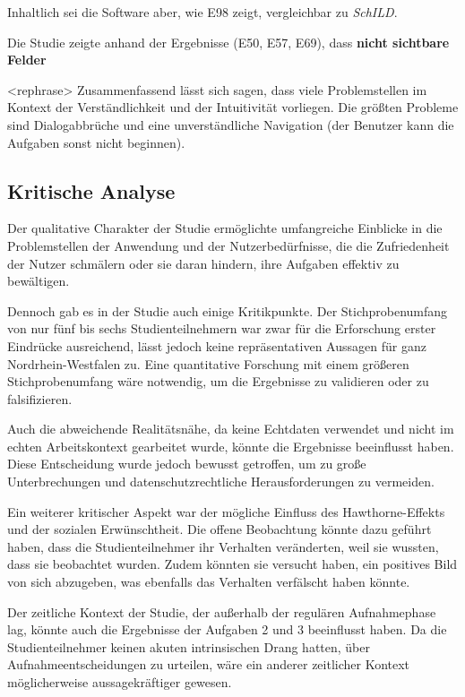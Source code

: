 Inhaltlich sei die Software aber, wie E98 zeigt, vergleichbar zu \textit{SchILD}.

Die Studie zeigte anhand der Ergebnisse (E50, E57, E69), dass \textbf{nicht sichtbare Felder}


<rephrase> Zusammenfassend lässt sich sagen, dass viele Problemstellen im Kontext der Verständlichkeit und der Intuitivität vorliegen. Die größten Probleme sind Dialogabbrüche und eine unverständliche Navigation (der Benutzer kann die Aufgaben sonst nicht beginnen).

\subsection{Kritische Analyse}
Der qualitative Charakter der Studie ermöglichte umfangreiche Einblicke in die Problemstellen der Anwendung und der Nutzerbedürfnisse, die die Zufriedenheit der Nutzer schmälern oder sie daran hindern, ihre Aufgaben effektiv zu bewältigen. 

Dennoch gab es in der Studie auch einige Kritikpunkte. Der Stichprobenumfang von nur fünf bis sechs Studienteilnehmern war zwar für die Erforschung erster Eindrücke ausreichend, lässt jedoch keine repräsentativen Aussagen für ganz Nordrhein-Westfalen zu. Eine quantitative Forschung mit einem größeren Stichprobenumfang wäre notwendig, um die Ergebnisse zu validieren oder zu falsifizieren.

Auch die abweichende Realitätsnähe, da keine Echtdaten verwendet und nicht im echten Arbeitskontext gearbeitet wurde, könnte die Ergebnisse beeinflusst haben. Diese Entscheidung wurde jedoch bewusst getroffen, um zu große Unterbrechungen und datenschutzrechtliche Herausforderungen zu vermeiden.

Ein weiterer kritischer Aspekt war der mögliche Einfluss des Hawthorne-Effekts und der sozialen Erwünschtheit. Die offene Beobachtung könnte dazu geführt haben, dass die Studienteilnehmer ihr Verhalten veränderten, weil sie wussten, dass sie beobachtet wurden. Zudem könnten sie versucht haben, ein positives Bild von sich abzugeben, was ebenfalls das Verhalten verfälscht haben könnte.

Der zeitliche Kontext der Studie, der außerhalb der regulären Aufnahmephase lag, könnte auch die Ergebnisse der Aufgaben 2 und 3 beeinflusst haben. Da die Studienteilnehmer keinen akuten intrinsischen Drang hatten, über Aufnahmeentscheidungen zu urteilen, wäre ein anderer zeitlicher Kontext möglicherweise aussagekräftiger gewesen.

